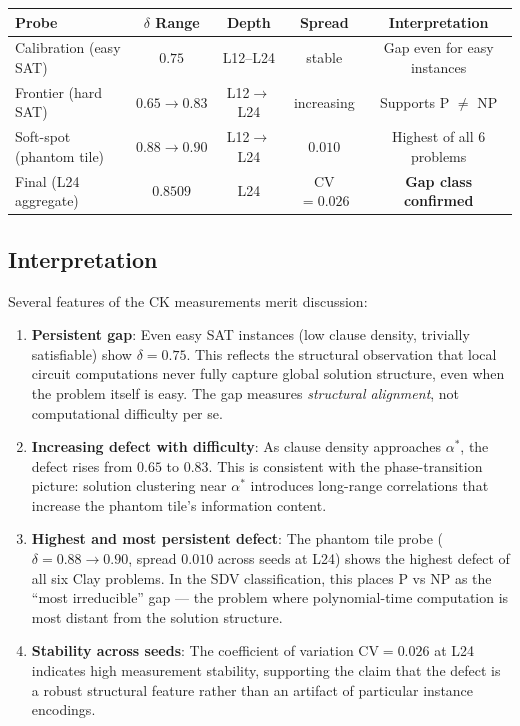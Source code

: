 \documentclass[11pt]{article}
\theoremstyle{definition}
\theoremstyle{remark}
\begin{document}
\begin{center}
\begin{tabular}{@{}lcccc@{}}
\toprule
\textbf{Probe} & \textbf{$\delta$ Range} & \textbf{Depth} & \textbf{Spread} & \textbf{Interpretation} \\
\midrule
Calibration (easy SAT) & $0.75$ & L12--L24 & stable & Gap even for easy instances \\
Frontier (hard SAT) & $0.65 \to 0.83$ & L12$\to$L24 & increasing & Supports P $\neq$ NP \\
Soft-spot (phantom tile) & $0.88 \to 0.90$ & L12$\to$L24 & $0.010$ & Highest of all 6 problems \\
\midrule
Final (L24 aggregate) & $0.8509$ & L24 & CV $= 0.026$ & \textbf{Gap class confirmed} \\
\bottomrule
\end{tabular}
\end{center}

\subsection{Interpretation}

Several features of the CK measurements merit discussion:

\begin{enumerate}
  \item \textbf{Persistent gap}: Even easy SAT instances (low clause density,
    trivially satisfiable) show $\delta = 0.75$.  This reflects the structural
    observation that local circuit computations never fully capture global
    solution structure, even when the problem itself is easy.  The gap measures
    \emph{structural alignment}, not computational difficulty per se.

  \item \textbf{Increasing defect with difficulty}: As clause density approaches
    $\alpha^*$, the defect rises from $0.65$ to $0.83$.  This is consistent
    with the phase-transition picture: solution clustering near $\alpha^*$
    introduces long-range correlations that increase the phantom tile's
    information content.

  \item \textbf{Highest and most persistent defect}: The phantom tile probe
    ($\delta = 0.88 \to 0.90$, spread $0.010$ across seeds at L24) shows the
    highest defect of all six Clay problems.  In the SDV classification, this
    places P vs NP as the ``most irreducible'' gap --- the problem where
    polynomial-time computation is most distant from the solution structure.

  \item \textbf{Stability across seeds}: The coefficient of variation
    $\mathrm{CV} = 0.026$ at L24 indicates high measurement stability,
    supporting the claim that the defect is a robust structural feature
    rather than an artifact of particular instance encodings.
\end{enumerate}
\end{document}
